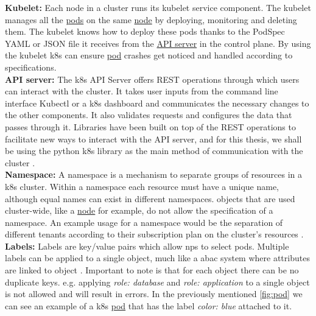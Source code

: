 \textbf{Kubelet:} \label{comp:kubelet} Each node in a cluster runs its kubelet service component. The kubelet manages all the \hyperref[comp:pod]{pods} on the same \hyperref[comp:node]{node} by deploying, monitoring and deleting them. The kubelet knows how to deploy these pods thanks to the PodSpec YAML or JSON file it receives from the \hyperref[comp:apiserver]{API server} in the control plane. By using the kubelet \acrshort{k8s} can ensure \hyperref[comp:pod]{pod} crashes get noticed and handled according to specifications. \cite{kubelet}
\\[10pt]

\textbf{API server:} \label{comp:apiserver} The \acrshort{k8s} API Server offers REST operations through which users can interact with the cluster. It takes user inputs from the command line interface Kubectl or a \acrshort{k8s} dashboard and communicates the necessary changes to the other components. It also validates requests and configures the data that passes through it. Libraries have been built on top of the REST operations to facilitate new ways to interact with the API server, and for this thesis, we shall be using the python \acrshort{k8s} library as the main method of communication with the cluster \cite{pythonk8s} \cite{kubeapiserver}.
\\[10pt]


\textbf{Namespace:} \label{comp:namespace} A namespace is a mechanism to separate groups of resources in a \acrshort{k8s} cluster. Within a namespace each resource must have a unique name, although equal names can exist in different namespaces. objects that are used cluster-wide, like a \hyperref[comp:node]{node} for example, do not allow the specification of a namespace. An example usage for a namespace would be the separation of different tenants according to their subscription plan on the cluster's resources \cite{namespace} \cite{feasability}.
\\[10pt]


\textbf{Labels:} \label{comp:label} Labels are key/value pairs which allow \acrshort{np}s to select pods. Multiple labels can be applied to a single object, much like a \acrfull{abac} system where attributes are linked to object \cite{abac}. Important to note is that for each object there can be no duplicate keys. e.g. applying \textit{role: database} and \textit{role: application} to a single object is not allowed and will result in errors. In the previously mentioned \autoref{fig:pod} we can see an example of a \acrshort{k8s} \hyperref[comp:pod]{pod} that has the label \textit{color: blue} attached to it. 
\\[5pt]

